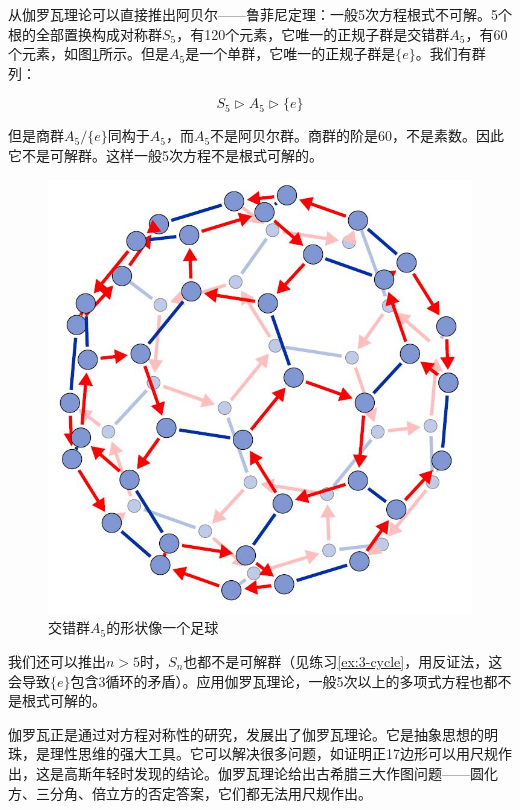 \documentclass[b5paper]{ctexart}
\begin{document}
从伽罗瓦理论可以直接推出阿贝尔——鲁菲尼定理：一般5次方程根式不可解。5个根的全部置换构成对称群$S_5$，有120个元素，它唯一的正规子群是交错群$A_5$，有60个元素，如图\ref{fig:A5-Cayley}所示。但是$A_5$是一个单群，它唯一的正规子群是$\{e\}$。我们有群列：

\[
S_5 \rhd A_5 \rhd \{e\}
\]

但是商群$A_5/\{e\}$同构于$A_5$，而$A_5$不是阿贝尔群。商群的阶是60，不是素数。因此它不是可解群。这样一般5次方程不是根式可解的。

\begin{figure}[htbp]
 \centering
 \includegraphics[scale=0.25]{img/A5-Cayley}
 \captionsetup{labelformat=empty}
 \caption{交错群$A_5$的形状像一个足球}
 \label{fig:A5-Cayley}
\end{figure}

我们还可以推出$n > 5$时，$S_n$也都不是可解群（见练习\ref{ex:3-cycle}，用反证法，这会导致$\{e\}$包含3循环的矛盾）。应用伽罗瓦理论，一般5次以上的多项式方程也都不是根式可解的。

伽罗瓦正是通过对方程对称性的研究，发展出了伽罗瓦理论。它是抽象思想的明珠，是理性思维的强大工具。它可以解决很多问题，如证明正17边形可以用尺规作出，这是高斯年轻时发现的结论。伽罗瓦理论给出古希腊三大作图问题——圆化方、三分角、倍立方的否定答案，它们都无法用尺规作出。

\begin{Exercise}\label{ex:solvable}
\label{ex:3-cycle}
\end{Exercise}
\end{document}
